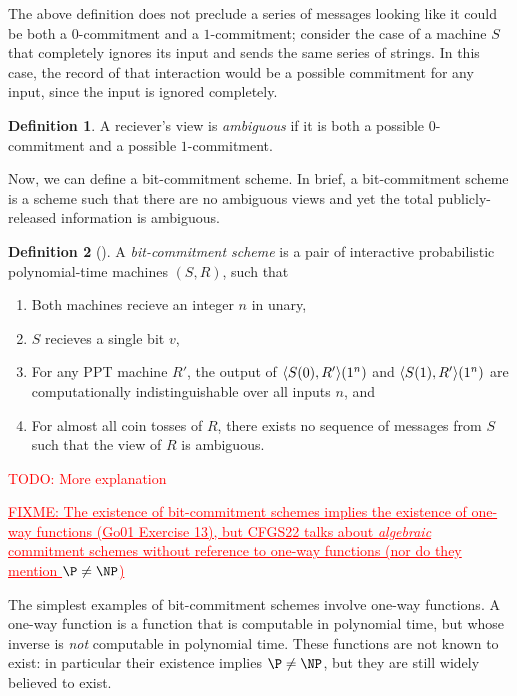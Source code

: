 \documentclass[english,12pt]{reedthesis}
\theoremstyle{plain}
\theoremstyle{definition}
\newtheorem{defn}[defn]{Definition}
\theoremstyle{remark}
\DeclarePairedDelimiter{\ang}{\langle}{\rangle}
\newcommand{\TODO}[1]{\textcolor{red}{TODO: #1}}
\newcommand{\FIXME}[1]{\textcolor{red}{\ul{FIXME: #1}}}
\begin{document}
The above definition does not preclude a series of messages looking like it
could be both a $0$-commitment and a $1$-commitment; consider the case of a
machine $S$ that completely ignores its input and sends the same series of
strings. In this case, the record of that interaction would be a possible
commitment for any input, since the input is ignored completely.

\begin{defn}\label{def:ambiguous-view}
  A reciever's view is \emph{ambiguous} if it is both a possible $0$-commitment
  and a possible $1$-commitment.
\end{defn}

Now, we can define a bit-commitment scheme. In brief, a bit-commitment scheme is
a scheme such that there are no ambiguous views and yet the total
publicly-released information is ambiguous.

\begin{defn}[{\cite[Def.\ 4.4.1]{Go01}}]\label{def:commitment-scheme}
  A \emph{bit-commitment scheme} is a pair of interactive probabilistic
  polynomial-time machines $(S, R)$, such that
  \begin{enumerate}
    \item Both machines recieve an integer $n$ in unary,
    \item $S$ recieves a single bit $v$,
    \item For any PPT machine $R'$, the output of $\ang{S(0), R'}(1^{n})$ and
          $\ang{S(1), R'}(1^{n})$ are computationally indistinguishable over all
          inputs $n$, and
    \item For almost all coin tosses of $R$, there exists no sequence of
          messages from $S$ such that the view of $R$ is ambiguous.
  \end{enumerate}
\end{defn}

\TODO{More explanation}

\FIXME{The existence of bit-commitment schemes implies the existence of one-way
  functions (Go01 Exercise 13), but CFGS22 talks about \emph{algebraic}
  commitment schemes without reference to one-way functions (nor do they mention
  $\P \ne \NP$)}

The simplest examples of bit-commitment schemes involve one-way functions. A
one-way function is a function that is computable in polynomial time, but whose
inverse is \emph{not} computable in polynomial time. These functions are not
known to exist: in particular their existence implies $\P \ne \NP$, but they are
still widely believed to exist.
\end{document}
